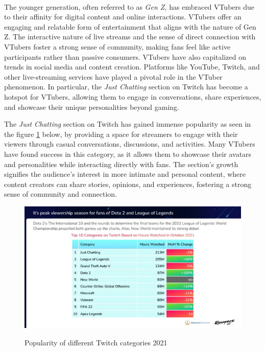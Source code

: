 \\
The younger generation, often referred to as \emph{Gen Z,} has embraced VTubers due to their affinity for digital content and online interactions. 
VTubers offer an engaging and relatable form of entertainment that aligns with the nature of Gen Z. The interactive nature of live streams and the 
sense of direct connection with VTubers foster a strong sense of community, making fans feel like 
active participants rather than passive consumers.
VTubers have also capitalized on trends in social media and content creation. Platforms like YouTube, Twitch, 
and other live-streaming services have played a pivotal role in the VTuber phenomenon. In particular, the \emph{Just Chatting} section on Twitch has become 
a hotspot for VTubers, allowing them to engage in conversations, share experiences, and showcase their unique personalities beyond gaming. \cite{vtubing2}

The \emph{Just Chatting} section on Twitch has gained immense popularity as seen in the figure \ref{fig:justchattwitch} below, by providing a space for 
streamers to engage with their viewers through casual conversations, discussions, and activities. Many VTubers have found success in this category, as 
it allows them to showcase their avatars and personalities while interacting directly with fans. The section's growth signifies the audience's 
interest in more intimate and personal content, where content creators can share stories, opinions, and experiences, fostering a strong sense of community and connection.
\\
\begin{figure}[htb]
    \centering
    \includegraphics[width=1\textwidth]{pics/justchattwitch.jpg}
    \caption{Popularity of different Twitch categories 2021}
    \cite{geekwire}
    \label{fig:justchattwitch}
\end{figure}
\\
